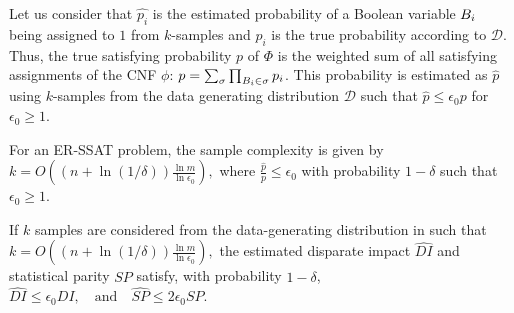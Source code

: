Let us consider that $\hat{p_i}$ is the estimated probability of a Boolean variable $ B_i $ being assigned to $ 1 $ from $k$-samples and $p_i$ is the true probability according to $ \mathcal{D} $. 
Thus, the true satisfying probability $p$ of $ \Phi $ is the weighted sum of all satisfying assignments of the CNF $ \phi $: $p = \sum_\sigma \prod_{B_i \in \sigma}p_i$.
This probability is estimated as $\hat{p}$ using $k$-samples from the data generating distribution $\mathcal{D}$ such that $\hat{p} \leq \epsilon_0 p$ for $\epsilon_0 \geq 1$. 
\iffalse
If we consider $\epsilon_i = \frac{\ln \epsilon_0}{2^i}$, we obtain
\begin{equation*}
\begin{split}
\prod_{i =1}^m (1 \pm \epsilon_i) &\leq \left(\frac{1}{n} \sum_{i} (1 + \epsilon_i)\right)^n \\
&= (\frac{1}{n} \sum_{i} (1+\frac{\ln \epsilon_0}{2^i})^n\\
&\leq (1  +\frac{\ln \epsilon_0}{n})^n\\
&\leq e^{\ln \epsilon_0} = \epsilon_0.\notag
\end{split}
\end{equation*}
\fi
\begin{theorem}\label{fairness_justicia_thm:sample}
	For an ER-SSAT problem, the sample complexity is given by 
	$ k = O\left((n+ \ln(1/\delta))\frac{\ln m}{\ln \epsilon_0} \right),$
	where $\frac{\hat{p}}{p} \leq \epsilon_0$ with probability $1-\delta$ such that $\epsilon_0 \geq 1$.
\end{theorem}
\begin{corollary}
	If $k$ samples are considered from the data-generating distribution in {\justicia} such that 
	$
	k = O\left((n+ \ln(1/\delta))\frac{\ln m}{\ln \epsilon_0}\right),
	$
	the estimated disparate impact $\hat{DI}$ and statistical parity $\hat{SP}$ satisfy, with probability $1-\delta$,
	$
	\hat{DI} \leq  \epsilon_0 DI, \quad \text{and} \quad \hat{SP} \leq 2\epsilon_0 SP.
	$
\end{corollary}
